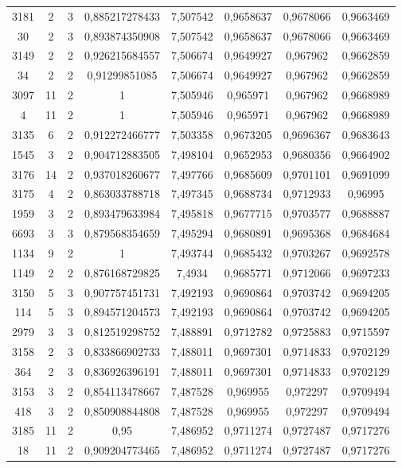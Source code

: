 \begin{longtable}{|c|c|c|c|c|c|c|c|}
3181 & 2 & 3 & 0,885217278433 & 7,507542 & 0,9658637 & 0,9678066 & 0,9663469 \\
30 & 2 & 3 & 0,893874350908 & 7,507542 & 0,9658637 & 0,9678066 & 0,9663469 \\
3149 & 2 & 2 & 0,926215684557 & 7,506674 & 0,9649927 & 0,967962 & 0,9662859 \\
34 & 2 & 2 & 0,91299851085 & 7,506674 & 0,9649927 & 0,967962 & 0,9662859 \\
3097 & 11 & 2 & 1 & 7,505946 & 0,965971 & 0,967962 & 0,9668989 \\
4 & 11 & 2 & 1 & 7,505946 & 0,965971 & 0,967962 & 0,9668989 \\
3135 & 6 & 2 & 0,912272466777 & 7,503358 & 0,9673205 & 0,9696367 & 0,9683643 \\
1545 & 3 & 2 & 0,904712883505 & 7,498104 & 0,9652953 & 0,9680356 & 0,9664902 \\
3176 & 14 & 2 & 0,937018260677 & 7,497766 & 0,9685609 & 0,9701101 & 0,9691099 \\
3175 & 4 & 2 & 0,863033788718 & 7,497345 & 0,9688734 & 0,9712933 & 0,96995 \\
1959 & 3 & 2 & 0,893479633984 & 7,495818 & 0,9677715 & 0,9703577 & 0,9688887 \\
6693 & 3 & 3 & 0,879568354659 & 7,495294 & 0,9680891 & 0,9695368 & 0,9684684 \\
1134 & 9 & 2 & 1 & 7,493744 & 0,9685432 & 0,9703267 & 0,9692578 \\
1149 & 2 & 2 & 0,876168729825 & 7,4934 & 0,9685771 & 0,9712066 & 0,9697233 \\
3150 & 5 & 3 & 0,907757451731 & 7,492193 & 0,9690864 & 0,9703742 & 0,9694205 \\
114 & 5 & 3 & 0,894571204573 & 7,492193 & 0,9690864 & 0,9703742 & 0,9694205 \\
2979 & 3 & 3 & 0,812519298752 & 7,488891 & 0,9712782 & 0,9725883 & 0,9715597 \\
3158 & 2 & 3 & 0,833866902733 & 7,488011 & 0,9697301 & 0,9714833 & 0,9702129 \\
364 & 2 & 3 & 0,836926396191 & 7,488011 & 0,9697301 & 0,9714833 & 0,9702129 \\
3153 & 3 & 2 & 0,854113478667 & 7,487528 & 0,969955 & 0,972297 & 0,9709494 \\
418 & 3 & 2 & 0,850908844808 & 7,487528 & 0,969955 & 0,972297 & 0,9709494 \\
3185 & 11 & 2 & 0,95 & 7,486952 & 0,9711274 & 0,9727487 & 0,9717276 \\
18 & 11 & 2 & 0,909204773465 & 7,486952 & 0,9711274 & 0,9727487 & 0,9717276 \\

\end{longtable}
